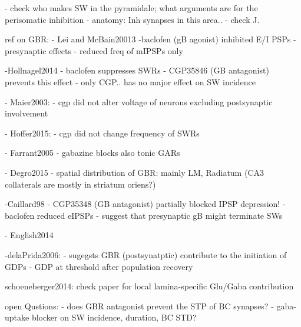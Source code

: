   - check who makes SW in the pyramidale; what arguments are for the perisomatic inhibition
      - anatomy: Inh synapses in this area..
      - check J.


  ref on GBR:
    - Lei and McBain20013
      -baclofen (gB agonist) inhibited E/I PSPs
      - presynaptic effects
      - reduced freq of mIPSPs only

    -Hollnagel2014
      - baclofen suppresses SWRs
      - CGP35846 (GB antagonist) prevents this effect
      - only CGP.. has no major effect on SW incidence


    - Maier2003:
      - cgp did not alter voltage of neurons excluding postsynaptic involvement

    - Hoffer2015:
      - cgp did not change frequency of SWRs


    - Farrant2005
      - gabazine blocks also tonic GARs

    - Degro2015
      - spatial distribution of GBR: mainly LM, Radiatum
      (CA3 collaterals are mostly in striatum oriens?)

    -Caillard98
      - CGP35348 (GB antagonist) partially blocked IPSP depression!
      - baclofen reduced eIPSPs
      - suggest that presynaptic gB might terminate SWs

    - English2014


    -delaPrida2006:
      - sugegsts GBR (postsynatptic) contribute to the initiation of GDPs
      - GDP at threshold after population recovery

    schoeneberger2014: check paper for local lamina-specific Glu/Gaba contribution


  open Qustions:
    - does GBR antagonist prevent the STP of BC synapses?
    - gaba-uptake blocker on SW incidence, duration, BC STD?



